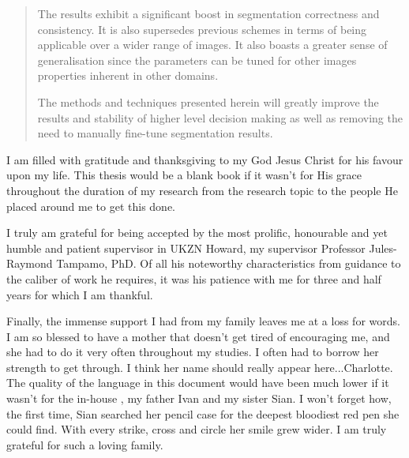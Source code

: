 \documentclass[
11pt, %
english, %
singlespacing, %
liststotoc, %
headsepline, %
]{MastersDoctoralThesis} %
\begin{document}
\begin{abstract}
The results exhibit a significant boost in segmentation correctness and consistency. It is also supersedes previous schemes in terms of being applicable over a wider range of images. It also boasts a greater sense of generalisation since the parameters can be tuned for other images properties inherent in other domains.

The methods and techniques presented herein will greatly improve the results and stability of higher level decision making as well as removing the need to manually fine-tune segmentation results.
\end{abstract}


\begin{acknowledgements}
\addchaptertocentry{\acknowledgementname} %

I am filled with gratitude and thanksgiving to my God Jesus Christ for his favour upon my life. This thesis would be a blank book if it wasn't for His grace throughout the duration of my research from the research topic to the people He placed around me to get this done.
 
I truly am grateful for being accepted by the most prolific, honourable and yet humble and patient supervisor in UKZN Howard, my supervisor Professor Jules-Raymond Tampamo, PhD. Of all his noteworthy characteristics from guidance to the caliber of work he requires, it was his patience with me for three and half years for which I am thankful.

Finally, the immense support I had from my family leaves me at a loss for words. I am so blessed to have a mother that doesn't get tired of encouraging me, and she had to do it very often throughout my studies. I often had to borrow her strength to get through. I think her name should really appear here...Charlotte. The quality of the language in this document would have been much lower if it wasn't for the in-house \textsf{}, my father Ivan and my sister Sian. I won't forget how, the first time, Sian searched her pencil case for the deepest bloodiest red pen she could find. With every strike, cross and circle her smile grew wider. I am truly grateful for such a loving family.

\end{acknowledgements}
\end{document}
